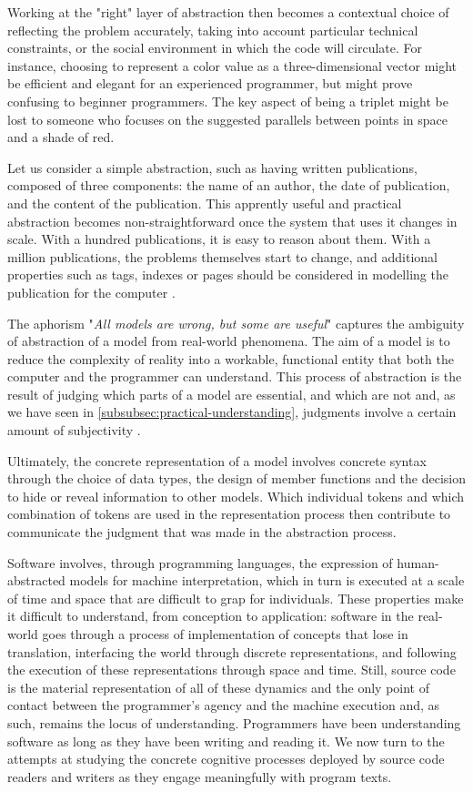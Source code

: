 Working at the "right" layer of abstraction then becomes a contextual choice of reflecting the problem accurately, taking into account particular technical constraints, or the social environment in which the code will circulate. For instance, choosing to represent a color value as a three-dimensional vector might be efficient and elegant for an experienced programmer, but might prove confusing to beginner programmers. The key aspect of being a triplet might be lost to someone who focuses on the suggested parallels between points in space and a shade of red.

Let us consider a simple abstraction, such as having written publications, composed of three components: the name of an author, the date of publication, and the content of the publication. This apprently useful and practical abstraction becomes non-straightforward once the system that uses it changes in scale. With a hundred publications, it is easy to reason about them. With a million publications, the problems themselves start to change, and additional properties such as tags, indexes or pages should be considered in modelling the publication for the computer \citep{cities_peter_2022}.

The aphorism "\emph{All models are wrong, but some are useful}" \citep{box_science_1976} captures the ambiguity of abstraction of a model from real-world phenomena. The aim of a model is to reduce the complexity of reality into a workable, functional entity that both the computer and the programmer can understand. This process of abstraction is the result of judging which parts of a model are essential, and which are not and, as we have seen in \autoref{subsubsec:practical-understanding}, judgments involve a certain amount of subjectivity \citep{weizenbaum_computer_1976}.

Ultimately, the concrete representation of a model involves concrete syntax through the choice of data types, the design of member functions and the decision to hide or reveal information to other models. Which individual tokens and which combination of tokens are used in the representation process then contribute to communicate the judgment that was made in the abstraction process.

\spacersmall

Software involves, through programming languages, the expression of human-abstracted models for machine interpretation, which in turn is executed at a scale of time and space that are difficult to grap for individuals. These properties make it difficult to understand, from conception to application: software in the real-world goes through a process of implementation of concepts that lose in translation, interfacing the world through discrete representations, and following the execution of these representations through space and time. Still, source code is the material representation of all of these dynamics and the only point of contact between the programmer's agency and the machine execution and, as such, remains the locus of understanding. Programmers have been understanding software as long as they have been writing and reading it. We now turn to the attempts at studying the concrete cognitive processes deployed by source code readers and writers as they engage meaningfully with program texts.

